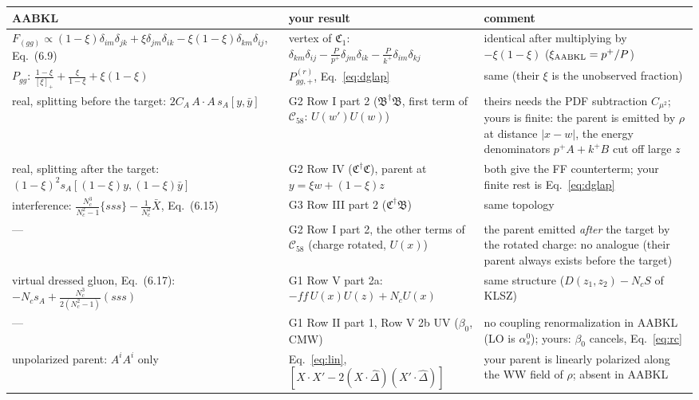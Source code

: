 \documentclass[10pt]{article}
\numberwithin{equation}{section}
\newcommand{\Dh}{\hat\Delta}
\begin{document}
{\small\renewcommand{\arraystretch}{1.25}
\begin{longtable}{@{}>{\raggedright\arraybackslash}p{}>{\raggedright\arraybackslash}p{}>{\raggedright\arraybackslash}p{}@{}}\toprule
AABKL & your result & comment\\\midrule\endhead
$F_{(gg)}\propto(1-\xi)\delta_{im}\delta_{jk}+\xi\delta_{jm}\delta_{ik}-\xi(1-\xi)\delta_{km}\delta_{ij}$, Eq.~(6.9) & vertex of $\mathfrak C_1$: $\delta_{km}\delta_{ij}-\frac{P}{p^+}\delta_{jm}\delta_{ik}-\frac{P}{k^+}\delta_{im}\delta_{kj}$ & identical after multiplying by $-\xi(1-\xi)$ ($\xi_{\rm AABKL}=p^+/P$)\\
$P_{gg}$: $\frac{1-\xi}{[\xi]_+}+\frac{\xi}{1-\xi}+\xi(1-\xi)$ & $P^{(r)}_{gg,+}$, Eq.~\eqref{eq:dglap} & same (their $\xi$ is the unobserved fraction)\\
real, splitting before the target: $2C_A\,A\!\cdot\! A\,s_A[y,\bar y]$ & G2 Row I part 2 ($\mathfrak B^\dagger\mathfrak B$, first term of $\mathcal C_{58}$: $U(w')U(w)$) & theirs needs the PDF subtraction $C_{\mu^2}$; yours is finite: the parent is emitted by $\rho$ at distance $|x-w|$, the energy denominators $p^+A+k^+B$ cut off large $z$\\
real, splitting after the target: $(1-\xi)^2s_A[(1-\xi)y,(1-\xi)\bar y]$ & G2 Row IV ($\mathfrak C^\dagger\mathfrak C$), parent at $y=\xi w+(1-\xi)z$ & both give the FF counterterm; your finite rest is Eq.~\eqref{eq:dglap}\\
interference: $\frac{N_c^3}{N_c^2-1}\{sss\}-\frac{1}{N_c^2}\bar X$, Eq.~(6.15) & G3 Row III part 2 ($\mathfrak C^\dagger\mathfrak B$) & same topology\\
--- & G2 Row I part 2, the other terms of $\mathcal C_{58}$ (charge rotated, $U(x)$) & the parent emitted \emph{after} the target by the rotated charge: no analogue (their parent always exists before the target)\\
virtual dressed gluon, Eq.~(6.17): $-N_cs_A+\frac{N_c^3}{2(N_c^2-1)}(sss)$ & G1 Row V part 2a: $-f f\,U(x)U(z)+N_cU(x)$ & same structure ($D(z_1,z_2)-N_cS$ of KLSZ)\\
--- & G1 Row II part 1, Row V 2b UV ($\beta_0$, CMW) & no coupling renormalization in AABKL (LO is $\alpha_s^0$); yours: $\beta_0$ cancels, Eq.~\eqref{eq:rc}\\
unpolarized parent: $A^i A^i$ only & Eq.~\eqref{eq:lin}, $[X\!\cdot X'-2(X\!\cdot\Dh)(X'\!\cdot\Dh)]$ & your parent is linearly polarized along the WW field of $\rho$; absent in AABKL\\

\end{longtable}}
\end{document}
